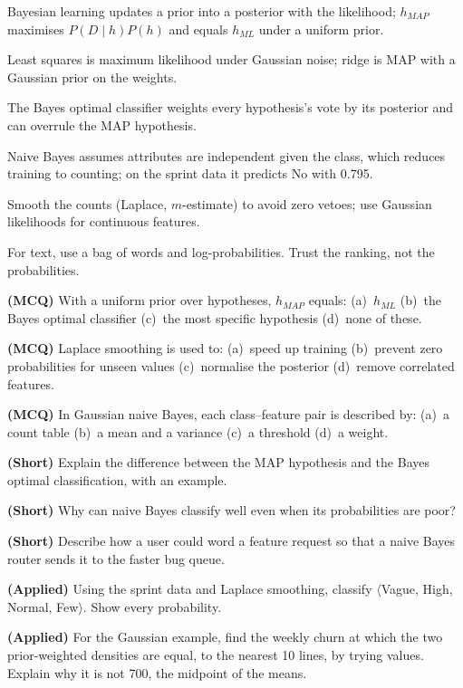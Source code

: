 \begin{chaptersummary}
\begin{tight}
  \item Bayesian learning updates a prior into a posterior with the likelihood;
        $h_{MAP}$ maximises $P(D\mid h)P(h)$ and equals $h_{ML}$ under a uniform prior.
  \item Least squares is maximum likelihood under Gaussian noise; ridge is MAP
        with a Gaussian prior on the weights.
  \item The Bayes optimal classifier weights every hypothesis's vote by its
        posterior and can overrule the MAP hypothesis.
  \item Naive Bayes assumes attributes are independent given the class, which
        reduces training to counting; on the sprint data it predicts No with 0.795.
  \item Smooth the counts (Laplace, $m$-estimate) to avoid zero vetoes; use
        Gaussian likelihoods for continuous features.
  \item For text, use a bag of words and log-probabilities. Trust the ranking, not
        the probabilities.
\end{tight}
\end{chaptersummary}

\begin{reviewq}
  \item \textbf{(MCQ)} With a uniform prior over hypotheses, $h_{MAP}$ equals:
        (a)~$h_{ML}$ (b)~the Bayes optimal classifier (c)~the most specific
        hypothesis (d)~none of these.
  \item \textbf{(MCQ)} Laplace smoothing is used to: (a)~speed up training
        (b)~prevent zero probabilities for unseen values (c)~normalise the
        posterior (d)~remove correlated features.
  \item \textbf{(MCQ)} In Gaussian naive Bayes, each class--feature pair is
        described by: (a)~a count table (b)~a mean and a variance (c)~a
        threshold (d)~a weight.
  \item \textbf{(Short)} Explain the difference between the MAP hypothesis and the
        Bayes optimal classification, with an example.
  \item \textbf{(Short)} Why can naive Bayes classify well even when its
        probabilities are poor?
  \item \textbf{(Short)} Describe how a user could word a feature request so that
        a naive Bayes router sends it to the faster bug queue.
  \item \textbf{(Applied)} Using the sprint data and Laplace smoothing, classify
        $\langle$Vague, High, Normal, Few$\rangle$. Show every probability.
  \item \textbf{(Applied)} For the Gaussian example, find the weekly churn at which
        the two prior-weighted densities are equal, to the nearest 10 lines, by
        trying values. Explain why it is not 700, the midpoint of the means.
\end{reviewq}
